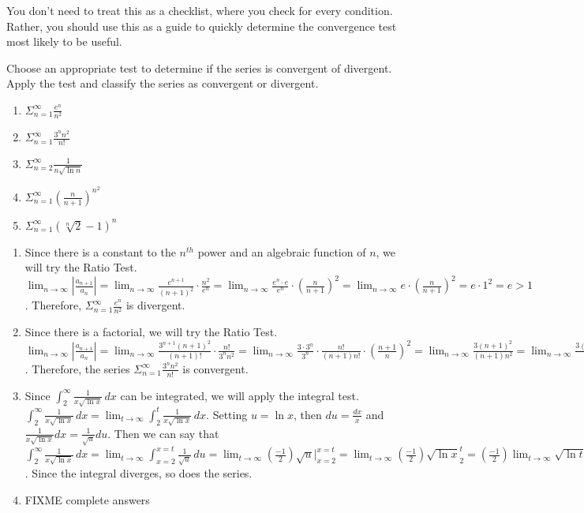 You don't need to treat this as a checklist, where you check for every 
condition. Rather, you should use this as a guide to quickly determine the 
convergence test most likely to be useful. 

\begin{Exercise}[label = test]
Choose an appropriate test to determine if the series is convergent of divergent. Apply the test and classify the series as convergent or divergent.
\begin{enumerate}
\item $\Sigma_{n=1}^\infty \frac{e^n}{n^2}$
\item $\Sigma_{n=1}^\infty \frac{3^n n^2}{n!}$
\item $\Sigma_{n=2}^\infty \frac{1}{n\sqrt{\ln{n}}}$
\item $\Sigma_{n=1}^\infty \left( \frac{n}{n+1} \right)^{n^2}$
\item $\Sigma_{n=1}^\infty \left( \sqrt[n]{2} - 1\right)^n$
\end{enumerate}
\end{Exercise}

\begin{Answer}[ref = test]
\begin{enumerate}
\item Since there is a constant to the $n^{th}$ power and an algebraic function of $n$, we will try the Ratio Test. $\lim_{n \to \infty} \left| \frac{a_{n+1}}{a_n} \right| = \lim_{n \to \infty} \frac{e^{n + 1}}{(n + 1)^2} \cdot \frac{n^2}{e^n} = \lim_{n \to \infty} \frac{e^n \cdot e}{e^n} \cdot \left( \frac{n}{n + 1} \right)^2 = \lim_{n \to \infty} e \cdot \left(\frac{n}{n + 1} \right)^2 = e \cdot 1^2 = e >1$. Therefore, $\Sigma_{n=1}^\infty \frac{e^n}{n^2}$ is divergent. 
\item Since there is a factorial, we will try the Ratio Test. $\lim_{n \to \infty} \left| \frac{a_{n+1}}{a_n} \right| = \lim_{n \to \infty} \frac{3^{n + 1}(n + 1)^2}{(n + 1)!} \cdot \frac{n!}{3^n n^2} = \lim_{n \to \infty} \frac{3 \cdot 3^n}{3^n} \cdot \frac{n!}{(n+1)n!} \cdot \left( \frac{n + 1}{n} \right)^2 = \lim_{n \to \infty} \frac{3(n+1)^2}{(n+1)n^2} = \lim_{n \to \infty} \frac{3(n+1)}{n^2} = 0 < 1$. Therefore, the series $\Sigma_{n=1}^\infty \frac{3^n n^2}{n!}$ is convergent. 
\item Since $\int_2^\infty \frac{1}{x\sqrt{\ln{x}}}\,dx$ can be integrated, we will apply the integral test. $\int_2^\infty \frac{1}{x\sqrt{\ln{x}}}\,dx = \lim_{t \to \infty} \int_2^t \frac{1}{x\sqrt{\ln{x}}}\,dx$. Setting $u = \ln{x}$, then $du = \frac{dx}{x}$ and $\frac{1}{x\sqrt{\ln{x}}}dx = \frac{1}{\sqrt{u}}du$. Then we can say that $\int_2^\infty \frac{1}{x\sqrt{\ln{x}}}\,dx = \lim_{t \to \infty} \int_{x=2}^{x=t} \frac{1}{\sqrt{u}}\,du = \lim_{t \to \infty} \left( \frac{-1}{2} \right) \sqrt{u} |_{x=2}^{x=t} = \lim_{t \to \infty} \left( \frac{-1}{2} \right) \sqrt{\ln{x}}_{2}^{t} = \left( \frac{-1}{2} \right) \lim_{t \to \infty} \sqrt{\ln{t}} - \left( \frac{-1}{2} \right) \sqrt{\ln{2}} = \infty$. Since the integral diverges, so does the series. 
\item FIXME complete answers
\end{enumerate}
\end{Answer}




